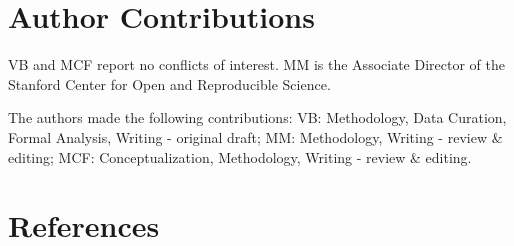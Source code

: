\documentclass[
  english,
  a4paper,
]{article}
\begin{document}
\hypertarget{author-contributions}{%
\section*{Author Contributions}\label{author-contributions}}

VB and MCF report no conflicts of interest. MM is the Associate Director of the Stanford Center for Open and Reproducible Science.

The authors made the following contributions: VB: Methodology, Data Curation, Formal Analysis, Writing - original draft;
MM: Methodology, Writing - review \& editing;
MCF: Conceptualization, Methodology, Writing - review \& editing.

\hypertarget{references}{%
\section*{References}\label{references}}
\end{document}
